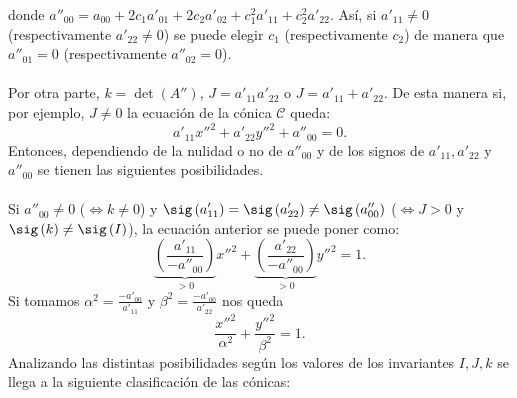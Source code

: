 donde $\displaystyle a''_{00} = a_{00} + 2c_{1}a'_{01}+2c_{2}a'_{02}+c_{1}^{2}a'_{11}+c_{2}^{2}a'_{22} $. Así, si $\displaystyle a'_{11} \neq 0 $ (respectivamente $\displaystyle a'_{22} \neq 0 $) se puede elegir $\displaystyle c_{1} $ (respectivamente $\displaystyle c_{2} $) de manera que $\displaystyle a''_{01} = 0 $ (respectivamente $\displaystyle a''_{02} = 0 $). \\ \\
Por otra parte, $\displaystyle k = \det\left(A''\right) $, $\displaystyle J = a'_{11}a'_{22} $ o $\displaystyle J = a'_{11} + a'_{22} $. De esta manera si, por ejemplo, $\displaystyle J \neq 0 $ la ecuación de la cónica $\displaystyle \mathcal{C} $ queda:
\[a'_{11}x''^{2}+a'_{22}y''^{2}+a''_{00} = 0 .\]
Entonces, dependiendo de la nulidad o no de $\displaystyle a''_{00} $ y de los signos de $\displaystyle a'_{11}, a'_{22} $ y $\displaystyle a''_{00} $ se tienen las siguientes posibilidades. \\ \\
Si $\displaystyle a''_{00} \neq 0 $ ($\displaystyle \iff k \neq 0 $) y $\displaystyle \sig\left(a'_{11}\right) = \sig\left(a'_{22}\right) \neq \sig\left(a''_{00}\right) $ ($\displaystyle \iff J > 0 $ y $\displaystyle \sig\left(k\right) \neq \sig\left(I\right) $), la ecuación anterior se puede poner como:
\[\underbrace{\left(\frac{a'_{11}}{-a''_{00}}\right)}_{>0}x''^{2} + \underbrace{\left(\frac{a'_{22}}{-a''_{00}}\right)}_{>0}y''^{2} = 1 .\]
Si tomamos $\displaystyle \alpha ^{2} = \frac{-a'_{00}}{a'_{11}} $ y $\displaystyle \beta ^{2} = \frac{-a'_{00}}{a'_{22}} $ nos queda 
\[\frac{x''^{2}}{\alpha^{2}}+\frac{y''^{2}}{\beta ^{2}} = 1 .\]
Analizando las distintas posibilidades según los valores de los invariantes $\displaystyle I, J, k $ se llega a la siguiente clasificación de las cónicas:
